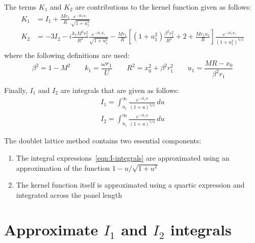 \documentclass[12pt]{article}
\newcommand{\f}{\frac}
\begin{document}
The terms $K_{1}$ and $K_{2}$ are contributions to the kernel function
given as follows:
%
\begin{equation*}
  \begin{aligned}
    K_{1} & = I_{1} + \f{Mr_{1}}{R} \f{e^{-ik_1 u_1}}{\sqrt{1 + u_{1}^2}} \\
    K_{2} & = -3I_{2} - i \f{k_1 M^2r_1^2}{R^2} \f{e^{-ik_1 u_1}}{\sqrt{1 + u_{1}^2}} 
    - \f{Mr_{1}}{R} \left[ (1 + u_{1}^2) \f{\beta^2r_{1}^2}{R^2} + 
      2 + \f{Mr_1u_{1}}{R} \right]\f{e^{-ik_1 u_1}}{(1 + u_{1}^2)^{3/2}} \\
  \end{aligned}
\end{equation*}
where the following definitions are used:
\begin{equation*}
  \beta^2 = 1 - M^2 \qquad 
  k_{1} = \f{\omega r_{1}}{U} \qquad 
  R^2 = x_{0}^2 + \beta^2r_{1}^2 \qquad 
  u_{1} = \f{MR - x_{0}}{\beta^2r_1}
\end{equation*}

Finally, $I_{1}$ and $I_{2}$ are integrals that are given as follows:
%
\begin{equation}
  \label{eqn:I-integrals}
  \begin{aligned}
    I_{1} = \int_{u_{1}}^{\infty} \f{e^{-ik_1u}}{(1 + u)^{3/2}} \, du \\
    I_{2} = \int_{u_{1}}^{\infty} \f{e^{-ik_1u}}{(1 + u)^{5/2}} \, du 
  \end{aligned}
\end{equation}

The doublet lattice method contains two essential components:
\begin{enumerate}
\item The integral expressions~\eqref{eqn:I-integrals} are
  approximated using an approximation of the function
  $1 - u/\sqrt{1 + u^2}$
\item The kernel function itself is approximated using a quartic
  expression and integrated across the panel length
\end{enumerate}

\section{Approximate $I_{1}$ and $I_{2}$ integrals}
\end{document}
